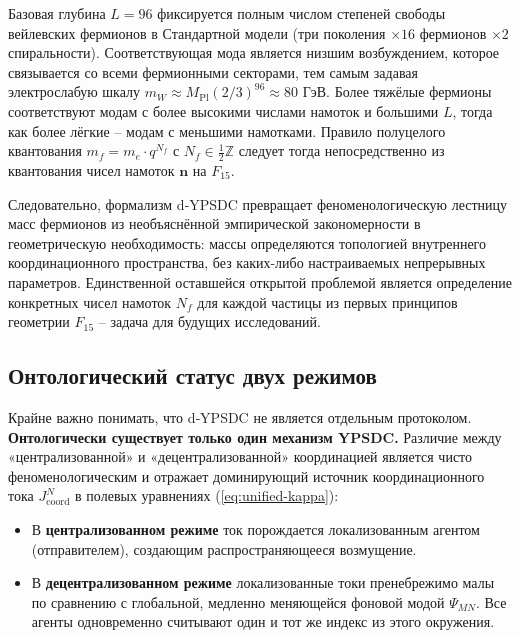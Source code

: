 \documentclass[11pt,a4paper]{article}
\begin{document}
	Базовая глубина \(L=96\) фиксируется полным числом степеней свободы вейлевских фермионов в Стандартной модели (три поколения \(\times 16\) фермионов \(\times 2\) спиральности). Соответствующая мода является низшим возбуждением, которое связывается со всеми фермионными секторами, тем самым задавая электрослабую шкалу \(m_W \approx M_{\mathrm{Pl}} (2/3)^{96} \approx 80\) ГэВ. Более тяжёлые фермионы соответствуют модам с более высокими числами намоток и большими \(L\), тогда как более лёгкие – модам с меньшими намотками. Правило полуцелого квантования \(m_f = m_e \cdot q^{N_f}\) с \(N_f \in \frac{1}{2}\mathbb{Z}\) следует тогда непосредственно из квантования чисел намоток \(\mathbf{n}\) на \(F_{15}\).
	
	Следовательно, формализм d‑YPSDC превращает феноменологическую лестницу масс фермионов из необъяснённой эмпирической закономерности в геометрическую необходимость: массы определяются топологией внутреннего координационного пространства, без каких-либо настраиваемых непрерывных параметров. Единственной оставшейся открытой проблемой является определение конкретных чисел намоток \(N_f\) для каждой частицы из первых принципов геометрии \(F_{15}\) – задача для будущих исследований.
	
	\subsection{Онтологический статус двух режимов}
	\label{subsec:ontological-status}
	
	Крайне важно понимать, что d‑YPSDC не является отдельным протоколом.
	\textbf{Онтологически существует только один механизм YPSDC.} Различие между
	«централизованной» и «децентрализованной» координацией является чисто феноменологическим и
	отражает доминирующий источник координационного тока
	\(J^{N}_{\mathrm{coord}}\) в полевых уравнениях (\ref{eq:unified-kappa}):
	
	\begin{itemize}[leftmargin=*]
		\item В \textbf{централизованном режиме} ток порождается локализованным
		агентом (отправителем), создающим распространяющееся возмущение.
		\item В \textbf{децентрализованном режиме} локализованные токи пренебрежимо малы
		по сравнению с глобальной, медленно меняющейся фоновой модой \(\Psi_{MN}\). Все агенты
		одновременно считывают один и тот же индекс из этого окружения.
	\end{itemize}
	
\end{document}
